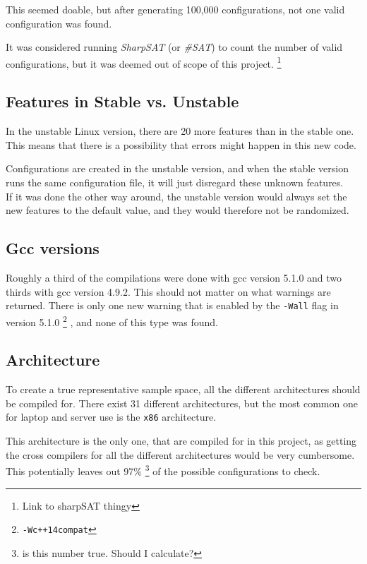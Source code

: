 \documentclass[a4paper,11pt]{report}
\begin{document}
This seemed doable, but after generating 100,000 configurations, not one 
valid configuration was found.

It was considered running \emph{SharpSAT} (or \emph{\#SAT}) to count the number
of valid configurations, but it was deemed out of scope of this project.
    \footnote{Link to sharpSAT thingy}


    \subsection{Features in Stable vs. Unstable}
In the unstable Linux version, there are 20 more features than in the stable 
one. This means that there is a possibility that errors might happen in this 
new code.

Configurations are created in the unstable version, and when the stable version 
runs the same configuration file, it will just disregard these unknown features.
\\

If it was done the other way around, the unstable version would always set the 
new features to the default value, and they would therefore not be randomized.


    \subsection{Gcc versions}
Roughly a third of the compilations were done with gcc version 5.1.0 and two 
thirds with gcc version 4.9.2. This should not matter on what warnings are 
returned. There is only one new warning that is enabled by the \texttt{-Wall} 
flag in version 5.1.0
    \footnote{\texttt{-Wc++14compat}}
, and none of this type was found.


    \subsection{Architecture}

To create a true representative sample space, all the different architectures 
should be compiled for. There exist 31 different architectures, but the most 
common one for laptop and server use is the \texttt{x86} architecture.

This architecture is the only one, that are compiled for in this project, as 
getting the cross compilers for all the different architectures would be very 
cumbersome. 
\\


This potentially leaves out 97\% \footnote{is this number true. Should I 
calculate?} of the possible configurations to check.
\end{document}
